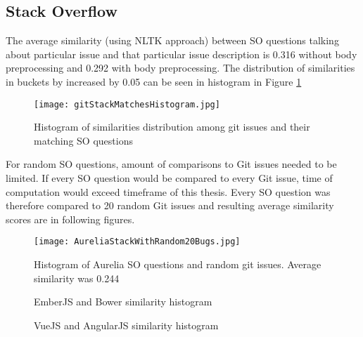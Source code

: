 \label{ssec:similarityResultsSO}
\subsection{Stack Overflow}
The average similarity (using NLTK approach) between SO questions talking about particular issue and that particular issue description is 0.316 without body preprocessing and 0.292 with body preprocessing. The distribution of similarities in buckets by increased by 0.05 can be seen in histogram in Figure \ref{fig:GitStackMatchesHistogram}

\begin{figure}[H]%
    \centering
	\texttt{[image: gitStackMatchesHistogram.jpg]}
    \caption{Histogram of similarities distribution among git issues and their matching SO questions}%
    \label{fig:GitStackMatchesHistogram}%
\end{figure}

For random SO questions, amount of comparisons to Git issues needed to be limited. If every SO question would be compared to every Git issue, time of computation would exceed timeframe of this thesis. Every SO question was therefore compared to 20 random Git issues and resulting average similarity scores are in following figures.

\begin{figure}[H]%
    \centering
	\texttt{[image: AureliaStackWithRandom20Bugs.jpg]}
    \caption{Histogram of Aurelia SO questions and random git issues. Average similarity was 0.244}%
    \label{fig:AureliaStackWithRandom3Bugs}%
\end{figure}

\begin{figure}[H]%
    \centering
    \qquad
    \caption{EmberJS and Bower similarity histogram}%
    \label{fig:BowerEmberWithRandom3Bugs}%
\end{figure}

\begin{figure}[H]%
    \centering
    \qquad
    \caption{VueJS and AngularJS similarity histogram}%
    \label{fig:VueAngularWithRandom3Bugs}%
\end{figure}


